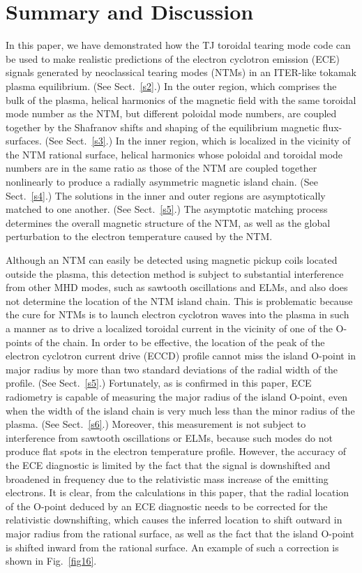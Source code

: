 \documentclass[12pt,prb,aps]{revtex4-1}
\begin{document}
\section{Summary and Discussion}\label{s7}
In this paper, we have demonstrated how the TJ toroidal tearing mode code can be used to make realistic predictions of  the electron cyclotron emission (ECE) signals generated by  neoclassical
tearing modes (NTMs) in an ITER-like tokamak plasma equilibrium. (See Sect.~\ref{s2}.) In the outer region, which comprises the bulk of the plasma, helical
harmonics of the magnetic field with the same toroidal mode number as the NTM, but different poloidal mode numbers, are coupled together by the Shafranov shifts and
shaping of the equilibrium magnetic flux-surfaces. (See Sect.~\ref{s3}.) In the inner region, which is localized in the vicinity of the NTM rational surface, helical harmonics whose
poloidal and toroidal mode numbers are in the same ratio as those of the NTM are coupled together nonlinearly to produce a radially asymmetric magnetic
island chain. (See Sect.~\ref{s4}.)  The solutions in the inner and outer regions are asymptotically matched to one another. (See Sect.~\ref{s5}.) The asymptotic matching process determines  the
overall magnetic structure of the NTM, as well as the global perturbation to the electron temperature caused by the NTM. 

Although an NTM can easily be detected using magnetic
pickup coils located outside the plasma, this detection method is subject to substantial interference from other MHD modes, such
as sawtooth oscillations and ELMs, and also does not determine the location of the NTM island chain. This is problematic because the
cure for NTMs is to launch electron cyclotron  waves into the plasma in such a manner as  to drive a localized toroidal current in the vicinity of one of the O-points of the chain. 
In order to be effective, the location of the peak of the electron cyclotron current drive (ECCD) profile cannot miss the island O-point in major radius by more than two standard deviations of the radial width of the profile. (See Sect.~\ref{s5}.) Fortunately, as is confirmed  in this paper, ECE radiometry is capable of measuring the major radius of the island O-point, even when the width of the island chain is
very much less than the minor radius of the plasma. (See Sect.~\ref{s6}.) Moreover, this measurement is not
subject to interference from sawtooth oscillations or ELMs, because such modes do not produce flat spots in the
electron temperature profile.  However, the accuracy of the ECE diagnostic is limited by the fact that the signal is downshifted and
broadened in frequency due to the relativistic mass increase of the emitting electrons. It is clear, from the calculations in this paper, that the radial location of the
O-point deduced by an ECE diagnostic needs to be corrected for the relativistic downshifting, which causes the inferred location to shift outward in major radius from the rational surface, 
as well as the fact that the island O-point is shifted inward from the rational surface. An example of such a correction is shown in Fig.~\ref{fig16}. 
\end{document}
